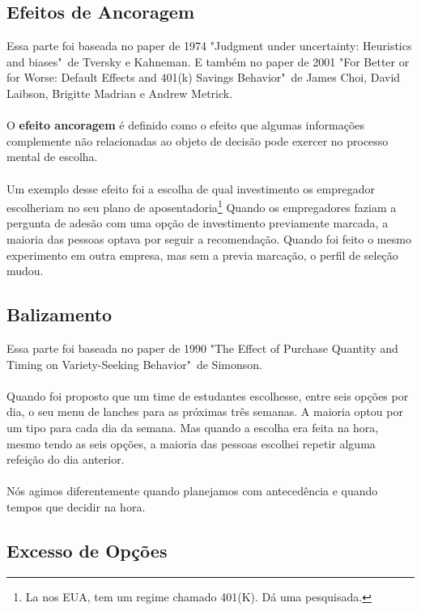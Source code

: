 \documentclass[a4paper,11pt,oneside]{book}
\theoremstyle{definition}
\theoremstyle{break}
\begin{document}
\subsection{Efeitos de Ancoragem}

Essa parte foi baseada no paper de 1974 "Judgment under uncertainty: Heuristics and biases"\ de Tversky e Kahneman. E também no paper de 2001 "For Better or for Worse: Default Effects and 401(k) Savings Behavior"\ de James Choi, David Laibson, Brigitte Madrian e Andrew Metrick.
\\~\\
O \textbf{efeito ancoragem} é definido como o efeito que algumas informações complemente não relacionadas ao objeto de decisão pode exercer no processo mental de escolha.
\\~\\
Um exemplo desse efeito foi a escolha de qual investimento os empregador escolheriam no seu plano de aposentadoria\footnote{La nos EUA, tem um regime chamado 401(K). Dá uma pesquisada.} Quando os empregadores faziam a pergunta de adesão com uma opção de investimento previamente marcada, a maioria das pessoas optava por seguir a recomendação. Quando foi feito o mesmo experimento em outra empresa, mas sem a previa marcação, o perfil de seleção mudou.

\subsection{Balizamento}

Essa parte foi baseada no paper de 1990 "The Effect of Purchase Quantity and Timing on Variety-Seeking Behavior"\ de Simonson.
\\~\\
Quando foi proposto que um time de estudantes escolhesse, entre seis opções por dia, o seu menu de lanches para as próximas três semanas. A maioria optou por um tipo para cada dia da semana. Mas quando a escolha era feita na hora, mesmo tendo as seis opções, a maioria das pessoas escolhei repetir alguma refeição do dia anterior.
\\~\\
Nós agimos diferentemente quando planejamos com antecedência e quando tempos que decidir na hora.

\subsection{Excesso de Opções}
\end{document}
